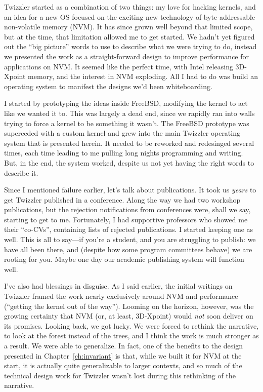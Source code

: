 Twizzler started as a combination of two things: my love for hacking kernels, and an idea for a new OS focused on the
exciting new technology of byte-addressable non-volatile memory (NVM). It has since grown well beyond that limited
scope, but at the time, that limitation allowed me to get started. We hadn't yet figured out the ``big picture'' words
to use to describe what we were trying to do, instead we presented the work as a straight-forward design to improve
performance for applications on NVM. It seemed like the perfect time, with Intel releasing 3D-Xpoint memory, and the
interest in NVM exploding. All I had to do was build an operating system to manifest the designs we'd been whiteboarding.

I started by prototyping the ideas inside FreeBSD, modifying the kernel to act like we wanted it to. This
was largely a dead end, since we rapidly ran into walls trying to force a \unix kernel to be something it wasn't. The
FreeBSD prototype was superceded with a custom kernel and grew into the main Twizzler operating system that is presented herein. It
needed to be reworked and redesinged several times, each time leading to me pulling long nights programming and writing.
But, in the end, the system worked, despite us not yet having the right words to describe it.

Since I mentioned failure earlier, let's talk about publications. It took us \emph{years} to get Twizzler published in a
conference. Along the way we had two workshop publications, but the rejection notifications from conferences were, shall
we say, starting to get to me. Fortunately, I had supportive professors who showed me their ``co-CVs'', containing lists of
rejected publications. I started keeping one as well. This is all to say---if you're a student, and you are struggling
to publish: we have all been there, and (despite how some program committees behave) we are rooting for you.
Maybe one day our academic publishing system will function well.

I've also had blessings in disguise. As I said earlier, the initial writings on Twizzler framed the work nearly
exclusively around NVM and performance (``getting the kernel out of the way'').
Looming on the horizon, however, was the growing certainty that NVM (or,
at least, 3D-Xpoint) would \emph{not} soon deliver on its promises. Looking back, we got lucky. We were forced to
rethink the narrative, to look at the forest instead of the trees, and I think the work is much stronger as a result. We
were able to generalize. In fact, one of the benefits to the design presented in Chapter~\ref{ch:invariant} is that,
while we built it for NVM at the start, it is actually quite generalizable to larger contexts, and so much of the
technical design work for Twizzler wasn't lost during this rethinking of the narrative.


